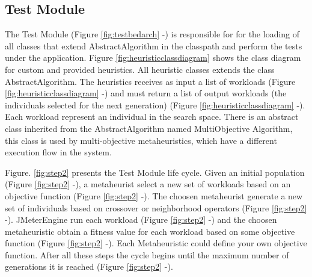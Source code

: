 \documentclass[espaco=umemeio,chapter=TITLE,twoside,openright]{abnt}
\begin{document}
\subsection{Test Module}

The Test Module (Figure \ref{fig:testbedarch}  -) is responsible for for the loading of all classes that extend AbstractAlgorithm in the classpath and perform the tests under the application. Figure \ref{fig:heuristicclassdiagram} shows the  class diagram for custom and provided heuristics. All heuristic classes extends the class AbstractAlgorithm. The heuristics receives  as input a  list of workloads (Figure \ref{fig:heuristicclassdiagram}  -) and must return a list of output workloads (the individuals selected for the next generation)  (Figure \ref{fig:heuristicclassdiagram}  -). Each workload represent an individual in the search space. There is an abstract class inherited from the AbstractAlgorithm named MultiObjective Algorithm, this class is used by multi-objective metaheuristics, which have a different execution flow in the system.

Figure. \ref{fig:step2} presents the Test Module life cycle. Given an initial population (Figure \ref{fig:step2}  -),  a metaheurist select a new set of workloads based on an objective function (Figure \ref{fig:step2}  -). The choosen metaheurist generate a new set of individuals based on crossover or neighborhood operators (Figure \ref{fig:step2}  -).  JMeterEngine run each workload (Figure \ref{fig:step2}  -) and the choosen metaheuristic obtain a fitness value for each workload based on some objective function  (Figure \ref{fig:step2}  -). Each Metaheuristic could define your own objective function. After all these steps the cycle begins until the maximum number of generations it is reached (Figure \ref{fig:step2}  -).
\end{document}
